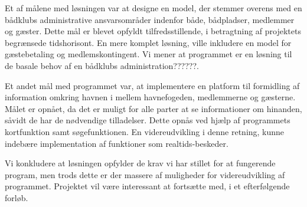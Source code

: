 Et af målene med løsningen var at designe en model, der stemmer overens med en bådklubs administrative ansvarsområder indenfor både, bådpladser, medlemmer og gæster. Dette mål er blevet opfyldt tilfredsstillende, i betragtning af projektets begrænsede tidshorisont. En mere komplet løsning, ville inkludere en model for gæstebetaling og medlemskontingent. Vi mener at programmet er en løsning til de basale behov af en bådklubs administration??????.

Et andet mål med programmet var, at implementere en platform til formidling af information omkring havnen i mellem havnefogeden, medlemmerne og gæsterne. Målet er opnået, da det er muligt for alle parter at se informationer om hinanden, såvidt de har de nødvendige tilladelser. Dette opnås ved hjælp af programmets kortfunktion samt søgefunktionen. En videreudvikling i denne retning, kunne indebære implementation af funktioner som realtids-beskeder.

Vi konkludere at løsningen opfylder de krav vi har stillet for at fungerende program, men trods dette er der massere af muligheder for videreudvikling af programmet. Projektet vil være interessant at fortsætte med, i et efterfølgende forløb. 